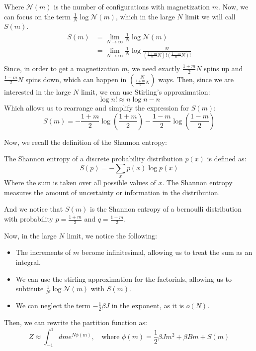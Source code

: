 Where $\mathcal{N}(m)$ is the number of configurations with magnetization $m$. Now, we can focus on the term $\frac{1}{N} \log\mathcal{N}(m)$, which in the large $N$ limit we will call $S(m)$.
\begin{equation}
    \begin{aligned}
        S(m) &= \lim_{N \rightarrow \infty}\frac{1}{N}\log\mathcal{N}(m)\\
        &= \lim_{N \rightarrow \infty}\frac{1}{N}\log \frac{N!}{\left(\frac{1+m}{n}N\right)!\left(\frac{1-m}{n}N\right)!}\\
    \end{aligned}
\end{equation}
Since, in order to get a magnetization $m$, we need exactly $\frac{1+m}{2}N$ spins up and $\frac{1-m}{2}N$ spins down, which can happen in $\binom{N}{\frac{1+m}{2}N}$ ways. Then, since we are interested in the large $N$ limit, we can use Stirling's approximation:
\begin{equation}
    \log n! \approx n\log n - n
\end{equation}
Which allows us to rearrange and simplify the expression for $S(m)$:
\begin{equation}
    S(m) = -\frac{1+m}{2}\log\left(\frac{1+m}{2}\right) - \frac{1-m}{2}\log\left(\frac{1-m}{2}\right)
\end{equation}

Now, we recall the definition of the Shannon entropy:
\begin{definition}
    The Shannon entropy of a discrete probability distribution $p(x)$ is defined as:
    \begin{equation}
        S(p) = -\sum_x p(x)\log p(x)
    \end{equation}
    Where the sum is taken over all possible values of $x$.
    The Shannon entropy measures the amount of uncertainty or information in the distribution.
\end{definition}

And we notice that $S(m)$ is the Shannon entropy of a bernoulli distribution with probability $p = \frac{1+m}{2}$ and $q = \frac{1-m}{2}$.

Now, in the large $N$ limit, we notice the following:
\begin{itemize}
    \item The increments of $m$ become infinitesimal, allowing us to treat the sum as an integral.
    \item We can use the stirling approximation for the factorials, allowing us to subtitute $\frac{1}{N}\log\mathcal{N}(m)$ with $S(m)$.
    \item We can neglect the term $-\frac{1}{2}\beta J$ in the exponent, as it is $o(N)$.
\end{itemize}
Then, we can rewrite the partition function as:
\begin{equation}
    \label{eq:curie_weiss_phi}
    Z \approx \int_{-1}^{1} dm e^{N\phi(m)}, \quad \text{where }
    \phi(m) = \frac{1}{2}\beta J m^2 + \beta B m + S(m)
\end{equation}


